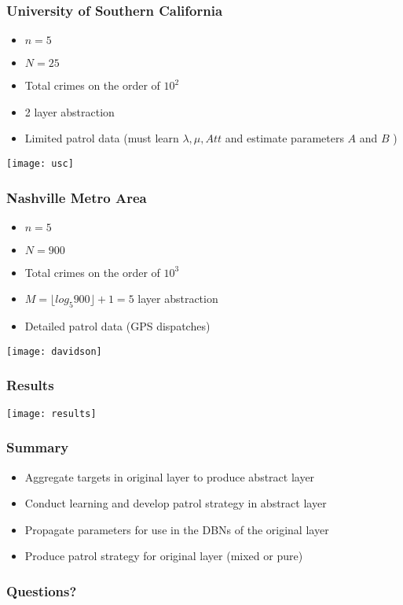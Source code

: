 \documentclass{beamer}
\begin{document}
	\begin{frame}
		\frametitle{University of Southern California}
		\begin{itemize}
			\item $n=5$
			\item $N=25$
			\item Total crimes on the order of $10^2$
			\item 2 layer abstraction
			\item Limited patrol data (must learn $\lambda, \mu, Att$ and estimate parameters $A$ and $B$ )
		\end{itemize}
		\texttt{[image: usc]}
	\end{frame}

	\begin{frame}
		\frametitle{Nashville Metro Area}
		\begin{itemize}
			\item $n=5$
			\item $N=900$
			\item Total crimes on the order of $10^3$
			\item $M=\lfloor log_{5}900 \rfloor + 1 = 5$ layer abstraction
			\item Detailed patrol data (GPS dispatches)
		\end{itemize}
		\texttt{[image: davidson]}
	\end{frame}

	\begin{frame}
		\frametitle{Results}
		\texttt{[image: results]}
	\end{frame}

	\begin{frame}
		\frametitle{Summary}
		\begin{itemize}
			\item Aggregate targets in original layer to produce abstract layer
			\item Conduct learning and develop patrol strategy in abstract layer
			\item Propagate parameters for use in the DBNs of the original layer
			\item Produce patrol strategy for original layer (mixed or pure)
		\end{itemize}
	\end{frame}

	\begin{frame}
		\frametitle{Questions?}
	\end{frame}
\end{document}
